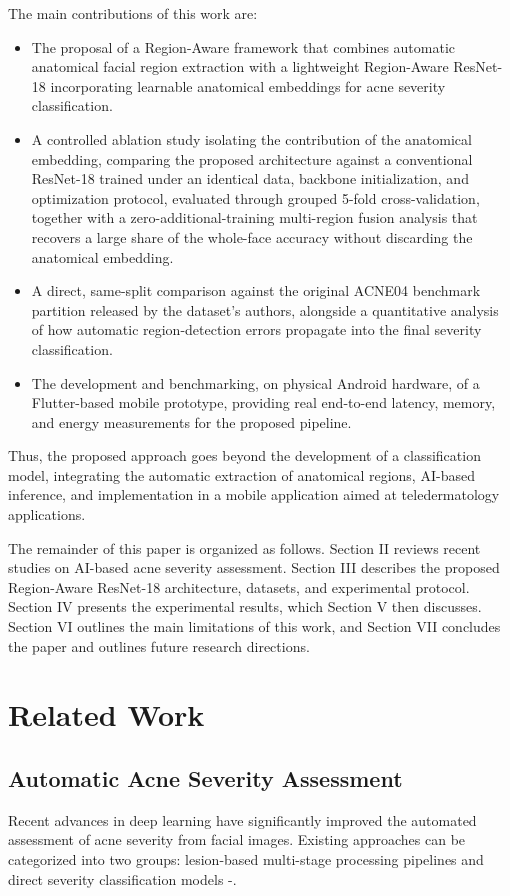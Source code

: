 \documentclass[conference]{IEEEtran}
\begin{document}
The main contributions of this work are:
\begin{itemize}
\item The proposal of a Region-Aware framework that combines automatic anatomical facial region extraction with a lightweight Region-Aware ResNet-18 incorporating learnable anatomical embeddings for acne severity classification.
\item A controlled ablation study isolating the contribution of the anatomical embedding, comparing the proposed architecture against a conventional ResNet-18 trained under an identical data, backbone initialization, and optimization protocol, evaluated through grouped 5-fold cross-validation, together with a zero-additional-training multi-region fusion analysis that recovers a large share of the whole-face accuracy without discarding the anatomical embedding.
\item A direct, same-split comparison against the original ACNE04 benchmark partition released by the dataset's authors, alongside a quantitative analysis of how automatic region-detection errors propagate into the final severity classification.
\item The development and benchmarking, on physical Android hardware, of a Flutter-based mobile prototype, providing real end-to-end latency, memory, and energy measurements for the proposed pipeline.
\end{itemize}

Thus, the proposed approach goes beyond the development of a classification model, integrating the automatic extraction of anatomical regions, AI-based inference, and implementation in a mobile application aimed at teledermatology applications.

The remainder of this paper is organized as follows. Section II reviews recent studies on AI-based acne severity assessment. Section III describes the proposed Region-Aware ResNet-18 architecture, datasets, and experimental protocol. Section IV presents the experimental results, which Section V then discusses. Section VI outlines the main limitations of this work, and Section VII concludes the paper and outlines future research directions.

\section{Related Work}

\subsection{Automatic Acne Severity Assessment}
Recent advances in deep learning have significantly improved the automated assessment of acne severity from facial images. Existing approaches can be categorized into two groups: lesion-based multi-stage processing pipelines and direct severity classification models \cite{b13} -\cite{b16}.
\end{document}
